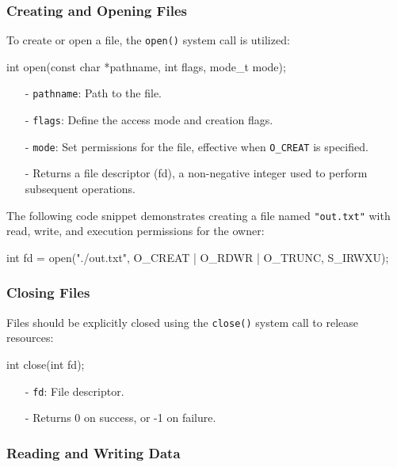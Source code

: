 \documentclass[../../compsys.tex]{subfiles}
\begin{document}
\subsubsection{Creating and Opening Files}
To create or open a file, the \texttt{open()} system call is utilized:
\begin{cc}
int open(const char *pathname, int flags, mode_t mode);
\end{cc}
\begin{itemize}[itemsep=3pt, topsep=3pt]
  \item[-] \texttt{pathname}: Path to the file.
  \item[-] \texttt{flags}: Define the access mode and creation flags.
  \item[-] \texttt{mode}: Set permissions for the file, effective when \texttt{O\_CREAT} is specified.
  \item[-] Returns a file descriptor (fd), a non-negative integer used to perform subsequent operations.
\end{itemize}

\begin{example}
The following code snippet demonstrates creating a file named \texttt{"out.txt"} with read, write, and execution permissions for the owner:
\begin{cc}
int fd = open("./out.txt", O_CREAT | O_RDWR | O_TRUNC, S_IRWXU);
\end{cc}
\end{example}

\subsubsection{Closing Files}

Files should be explicitly closed using the \texttt{close()} system call to release resources:

\begin{cc}
int close(int fd);
\end{cc}
\begin{itemize}[itemsep=2pt, topsep=1pt]
  \item[-] \texttt{fd}: File descriptor.
  \item[-] Returns 0 on success, or -1 on failure.
\end{itemize}

\subsubsection{Reading and Writing Data}
\end{document}
